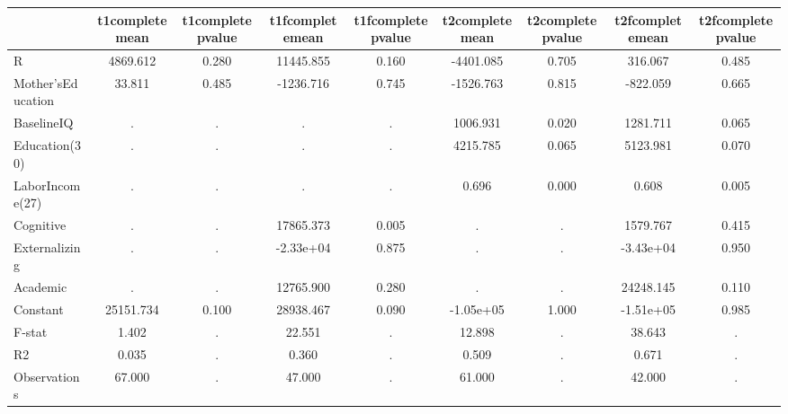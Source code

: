 \begin{table}[htbp]
\begin{tabular}{lcccccccc} \hline \hline
 & t1completemean  & t1completepvalue  & t1fcompletemean  & t1fcompletepvalue  & t2completemean  & t2completepvalue  & t2fcompletemean  & t2fcompletepvalue  \\  \hline 
R &  4869.612 &     0.280 & 11445.855 &     0.160 & -4401.085 &     0.705 &   316.067 &     0.485 \\  
Mother'sEducation &    33.811 &     0.485 & -1236.716 &     0.745 & -1526.763 &     0.815 &  -822.059 &     0.665 \\  
BaselineIQ &         . &         . &         . &         . &  1006.931 &     0.020 &  1281.711 &     0.065 \\  
Education(30) &         . &         . &         . &         . &  4215.785 &     0.065 &  5123.981 &     0.070 \\  
LaborIncome(27) &         . &         . &         . &         . &     0.696 &     0.000 &     0.608 &     0.005 \\  
Cognitive &         . &         . & 17865.373 &     0.005 &         . &         . &  1579.767 &     0.415 \\  
Externalizing &         . &         . & -2.33e+04 &     0.875 &         . &         . & -3.43e+04 &     0.950 \\  
Academic &         . &         . & 12765.900 &     0.280 &         . &         . & 24248.145 &     0.110 \\  
Constant & 25151.734 &     0.100 & 28938.467 &     0.090 & -1.05e+05 &     1.000 & -1.51e+05 &     0.985 \\  
F-stat &     1.402 &         . &    22.551 &         . &    12.898 &         . &    38.643 &         . \\  
R2 &     0.035 &         . &     0.360 &         . &     0.509 &         . &     0.671 &         . \\  
Observations &    67.000 &         . &    47.000 &         . &    61.000 &         . &    42.000 &         . \\  
\hline \hline \end{tabular}
\end{table}
